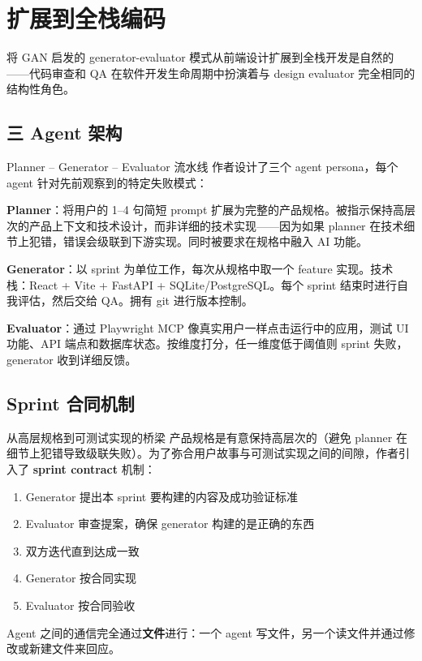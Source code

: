 \section{扩展到全栈编码}

将 GAN 启发的 generator-evaluator 模式从前端设计扩展到全栈开发是自然的——代码审查和 QA 在软件开发生命周期中扮演着与 design evaluator 完全相同的结构性角色。

\subsection{三 Agent 架构}

\begin{importantbox}{Planner -- Generator -- Evaluator 流水线}
作者设计了三个 agent persona，每个 agent 针对先前观察到的特定失败模式：

\textbf{Planner}：将用户的 1--4 句简短 prompt 扩展为完整的产品规格。被指示保持高层次的产品上下文和技术设计，而非详细的技术实现——因为如果 planner 在技术细节上犯错，错误会级联到下游实现。同时被要求在规格中融入 AI 功能。

\textbf{Generator}：以 sprint 为单位工作，每次从规格中取一个 feature 实现。技术栈：React + Vite + FastAPI + SQLite/PostgreSQL。每个 sprint 结束时进行自我评估，然后交给 QA。拥有 git 进行版本控制。

\textbf{Evaluator}：通过 Playwright MCP 像真实用户一样点击运行中的应用，测试 UI 功能、API 端点和数据库状态。按维度打分，任一维度低于阈值则 sprint 失败，generator 收到详细反馈。
\end{importantbox}

\subsection{Sprint 合同机制}

\begin{knowledgebox}{从高层规格到可测试实现的桥梁}
产品规格是有意保持高层次的（避免 planner 在细节上犯错导致级联失败）。为了弥合用户故事与可测试实现之间的间隙，作者引入了 \textbf{sprint contract} 机制：

\begin{enumerate}
    \item Generator 提出本 sprint 要构建的内容及成功验证标准
    \item Evaluator 审查提案，确保 generator 构建的是正确的东西
    \item 双方迭代直到达成一致
    \item Generator 按合同实现
    \item Evaluator 按合同验收
\end{enumerate}

Agent 之间的通信完全通过\textbf{文件}进行：一个 agent 写文件，另一个读文件并通过修改或新建文件来回应。
\end{knowledgebox}

